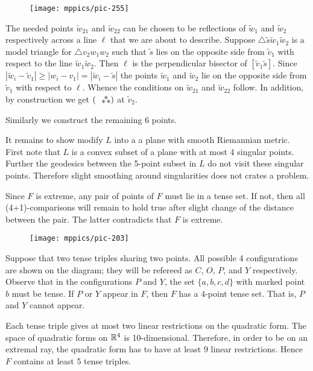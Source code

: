 \documentclass{article}
\begin{document}
\begin{wrapfigure}{r}{35mm}
\vskip-4mm
\centering
\texttt{[image: mppics/pic-255]}
\end{wrapfigure}

The needed points $\tilde w_{21}$ and $\tilde w_{22}$ can be chosen to be reflections of $\tilde w_{1}$ and $\tilde w_{2}$ respectively across a line $\ell$ that we are about to describe.
Suppose $\triangle \tilde s\tilde w_1 \tilde w_2$ is a model triangle for $\triangle v_2w_1w_2$ such that $\tilde s$ lies on the opposite side from $\tilde v_1$ with respect to the line $\tilde w_1\tilde w_2$.
Then $\ell$ is the perpendicular bisector of $[\tilde v_1 \tilde s]$.
Since $|\tilde w_i-\tilde v_1|\ge | w_i- v_1|=|\tilde w_i-\tilde s|$ the points $\tilde w_1$ and $\tilde w_2$ lie on the opposite side from $\tilde v_1$ with respect to $\ell$.
Whence the conditions on $\tilde w_{21}$ and $\tilde w_{22}$ follow.
In addition, by construction we get $(\asterism)$ at $\tilde v_2$.

Similarly we construct the remaining 6 points.

 It remains to show modify $L$ into a a plane with smooth Riemannian metric.
First note that $L$ is a convex subset of a plane with at most 4 singular points.
Further the geodesics between the 5-point subset in $L$ do not visit these singular points.
Therefore slight smoothing around singularities does not crates a problem.
\qeds


Since $F$ is extreme, any pair of points of $F$ must lie in a tense set.
If not, then all (4+1)-comparisons will remain to hold true after slight change of the distance between the pair.
The latter contradicts that $F$ is extreme.

\begin{wrapfigure}{l}{60mm}
\vskip-0mm
\centering
\texttt{[image: mppics/pic-203]}
\label{page:COPY}
\end{wrapfigure}

Suppose that two tense triples sharing two points.
All possible 4 configurations are shown on the diagram; they will be refereed as $C$, $O$, $P$, and $Y$ respectively.
Observe that in the configurations $P$ and $Y$, the set $\{a,b,c,d\}$ with marked point $b$ must be tense.
If $P$ or $Y$ appear in $F$, then $F$ has a 4-point tense set.
That is, $P$ and $Y$ cannot appear.

Each tense triple gives at most two linear restrictions on the quadratic form.
The space of quadratic forms on $\mathbb{R}^4$ is 10-dimensional.
Therefore, in order to be on an extremal ray, the quadratic form has to have at least 9 linear restrictions.
Hence $F$ contains at least 5 tense triples.
\end{document}
